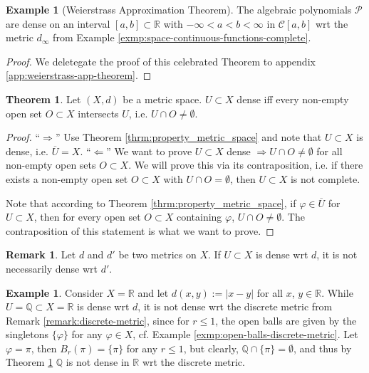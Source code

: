 \documentclass[12pt, a4paper]{article}
\numberwithin{equation}{section}
\theoremstyle{definition}
\theoremstyle{definition}
\newtheorem{exmp}[thm]{Example} %
\newtheorem{remark}[thm]{Remark} %
\newtheorem{theorem}[thm]{Theorem}
\newcommand{\abs}[1]{\left\vert #1 \right\vert}
\begin{document}
	\begin{exmp}[Weierstrass Approximation Theorem]\label{exmp:weierstrass-approx-thrm}
		The algebraic polynomials $\mathcal P$ are dense on an interval $[a, b]\subset \mathbb R$ with $-\infty < a < b < \infty$ in $\mathcal C[a, b]$ wrt the metric $d_{\infty}$ from Example \ref{exmp:space-continuous-functions-complete}. \cite[Corollary 6.12]{iske:approximation}
	\end{exmp}

	\begin{proof}
		We deletegate the proof of this celebrated Theorem to appendix \ref{app:weierstrass-app-theorem}. 
	\end{proof}

	\begin{theorem}\label{thrm:characterization-dense-subsets}
		Let $(X, d)$ be a metric space. $U\subset X$ dense iff every non-empty open set $O\subset X$ intersects $U$, i.e. $U\cap O\ne\emptyset$.
	\end{theorem}

	\begin{proof}
		\enquote{$\Longrightarrow$} Use Theorem \ref{thrm:property_metric_space} and note that $U\subset X$ is dense, i.e. $\overline{U} = X$.
		\newline\newline\enquote{$\Longleftarrow$} We want to prove $U\subset X$ dense $\Rightarrow U\cap O\ne\emptyset$ for all non-empty open sets $O\subset X$. We will prove this via its contraposition, i.e. if there exists a non-empty open set $O\subset X$ with $U\cap O=\emptyset$, then $U\subset X$ is not complete.
		
		Note that according to Theorem \ref{thrm:property_metric_space}, if $\varphi\in\overline{U}$ for $U\subset X$, then for every open set $O\subset X$ containing $\varphi$, $U\cap O\ne\emptyset$. The contraposition of this statement is what we want to prove.
	\end{proof}

	\begin{remark}
		Let $d$ and $d'$ be two metrics on $X$. If $U\subset X$ is dense wrt $d$, it is not necessarily dense wrt $d'$.
	\end{remark}

	\begin{exmp}
		Consider $X=\mathbb R$ and let $d(x, y) := \abs{x - y}$ for all $x$, $y\in\mathbb R$. While $U = \mathbb Q \subset X = \mathbb R$ is dense wrt $d$, it is not dense wrt the discrete metric from Remark \ref{remark:discrete-metric}, since for $r \leq 1$, the open balls are given by the singletons $\{\varphi\}$ for any $\varphi\in X$, cf. Example \ref{exmp:open-balls-discrete-metric}. Let $\varphi = \pi$, then $B_{r}(\pi) = \{\pi\}$ for any $r\leq 1$, but clearly, $\mathbb Q \cap \{\pi\} = \emptyset$, and thus by Theorem \ref{thrm:characterization-dense-subsets} $\mathbb Q$ is not dense in $\mathbb R$ wrt the discrete metric.
	\end{exmp}
\end{document}
